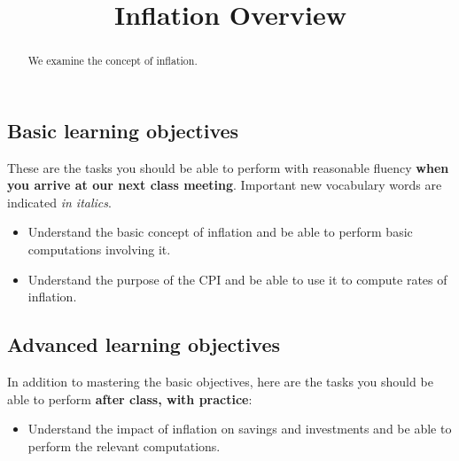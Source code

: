 \documentclass{ximera}
\title{Inflation Overview}
\begin{document}
\begin{abstract}
We examine the concept of inflation.
\end{abstract}
\maketitle

\subsection*{Basic learning objectives}

These are the tasks you should be able to perform with reasonable fluency \textbf{when you arrive at our next class meeting}. Important new vocabulary words are indicated \emph{in italics}. 

\begin{itemize}
	\item  Understand the basic concept of inflation and be able to perform basic computations involving it.
    \item Understand the purpose of the CPI and be able to use it to compute rates of inflation.
\end{itemize}

\subsection*{Advanced learning objectives}

In addition to mastering the basic objectives, here are the tasks you should be able to perform \textbf{after class, with practice}: 

\begin{itemize}
    \item Understand the impact of inflation on savings and investments and be able to perform the relevant computations. 
\end{itemize}
\end{document}
